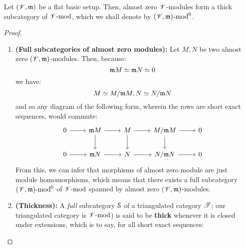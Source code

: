             \begin{proposition} \label{prop: thick_subcategories_of_almost_zero_modules}
                Let $(\scrV, \m)$ be a flat basic setup. Then, almost zero $\scrV$-modules form a thick subcategory of $\scrV\mod$, which we shall denote by $(\scrV, \m)\mod^0$.
            \end{proposition}
                \begin{proof}
                    \noindent
                    \begin{enumerate}
                        \item \textbf{(Full subcategories of almost zero modules):} Let $M, N$ be two almost zero $(\scrV, \m)$-modules. Then, because:
                            $$\m M \cong \m N \cong 0$$
                        we have:
                            $$M \cong M/\m M, N \cong N/\m N$$
                        and so any diagram of the following form, wherein the rows are short exact sequences, would commute:
                            $$
                                \begin{tikzcd}
                                	0 & {\m M} & M & {M/\m M} & 0 \\
                                	0 & {\m N} & N & {N/ \m N} & 0
                                	\arrow[from=1-1, to=1-2]
                                	\arrow[from=1-2, to=1-3]
                                	\arrow[from=1-3, to=1-4]
                                	\arrow[from=1-4, to=1-5]
                                	\arrow[from=2-1, to=2-2]
                                	\arrow[from=2-2, to=2-3]
                                	\arrow[from=2-3, to=2-4]
                                	\arrow[from=2-4, to=2-5]
                                	\arrow[from=1-2, to=2-2]
                                	\arrow[from=1-3, to=2-3]
                                	\arrow[from=1-4, to=2-4]
                                \end{tikzcd}
                            $$
                        From this, we can infer that morphisms of almost zero module are just module homomorphisms, which means that there exists a full subcategory $(\scrV, \m)\mod^0$ of $\scrV\mod$ spanned by almost zero $(\scrV, \m)$-modules.
                        \item \textbf{(Thickness):} A \textit{full} subcategory $\S$ of a triangulated category $\T$; our triangulated category is $\scrV\mod$) is said to be \textbf{thick} whenever it is closed under extensions, which is to say, for all short exact sequences:

\end{enumerate}
\end{proof}
